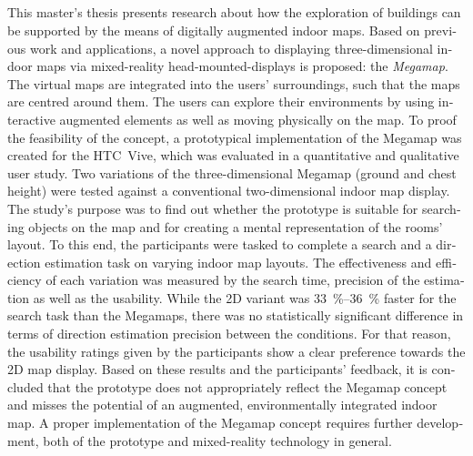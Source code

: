 \begin{otherlanguage}{british}
\chapter*{\abstractname}
\thispagestyle{empty}

This master's thesis presents research about how the exploration of buildings can be supported by the means of digitally augmented indoor maps.
Based on previous work and applications, a novel approach to displaying three-dimensional indoor maps via mixed-reality head-mounted-displays is proposed: the \emph{Megamap}.
The virtual maps are integrated into the users' surroundings, such that the maps are centred around them.
The users can explore their environments by using interactive augmented elements as well as moving physically on the map.
To proof the feasibility of the concept, a prototypical implementation of the Megamap was created for the HTC~Vive, which was evaluated in a quantitative and qualitative user study.
Two variations of the three-dimensional Megamap (ground and chest height) were tested against a conventional two-dimensional indoor map display.
The study's purpose was to find out whether the prototype is suitable for searching objects on the map and for creating a mental representation of the rooms' layout.
To this end, the participants were tasked to complete a search and a direction estimation task on varying indoor map layouts.
The effectiveness and efficiency of each variation was measured by the search time, precision of the estimation as well as the usability.
While the 2D variant was \SIrange{33}{36}{\percent} faster for the search task than the Megamaps, there was no statistically significant difference in terms of direction estimation precision between the conditions.
For that reason, the usability ratings given by the participants show a clear preference towards the 2D map display.
Based on these results and the participants' feedback, it is concluded that the prototype does not appropriately reflect the Megamap concept and misses the potential of an augmented, environmentally integrated indoor map.
A proper implementation of the Megamap concept requires further development, both of the prototype and mixed-reality technology in general.

\end{otherlanguage}
\cleardoublepage
